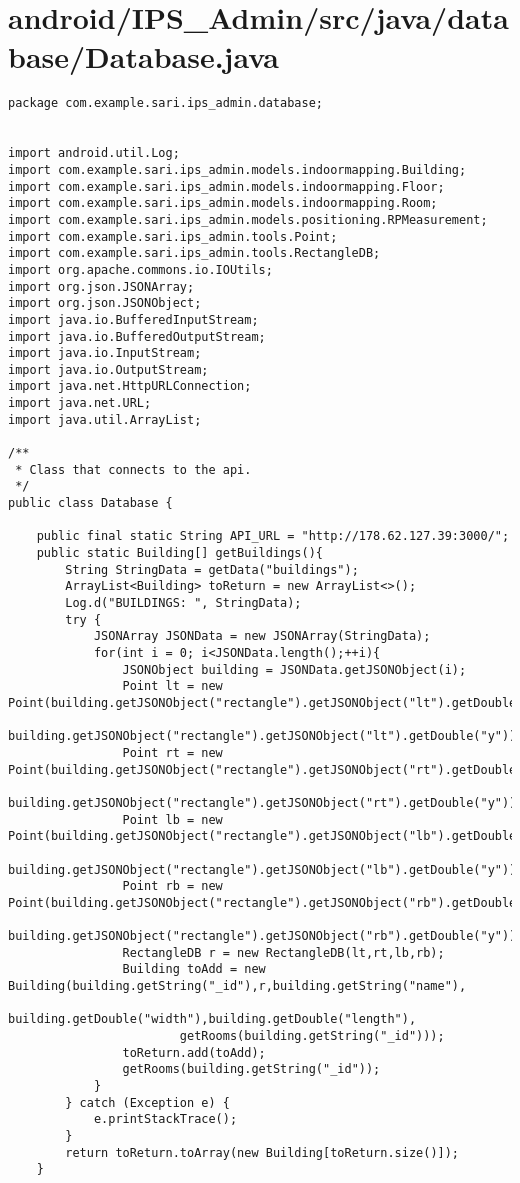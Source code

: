 \section{android/IPS\_Admin/src/java/database/Database.java}
\begin{lstlisting}package com.example.sari.ips_admin.database;


import android.util.Log;
import com.example.sari.ips_admin.models.indoormapping.Building;
import com.example.sari.ips_admin.models.indoormapping.Floor;
import com.example.sari.ips_admin.models.indoormapping.Room;
import com.example.sari.ips_admin.models.positioning.RPMeasurement;
import com.example.sari.ips_admin.tools.Point;
import com.example.sari.ips_admin.tools.RectangleDB;
import org.apache.commons.io.IOUtils;
import org.json.JSONArray;
import org.json.JSONObject;
import java.io.BufferedInputStream;
import java.io.BufferedOutputStream;
import java.io.InputStream;
import java.io.OutputStream;
import java.net.HttpURLConnection;
import java.net.URL;
import java.util.ArrayList;

/**
 * Class that connects to the api.
 */
public class Database {

    public final static String API_URL = "http://178.62.127.39:3000/";
    public static Building[] getBuildings(){
        String StringData = getData("buildings");
        ArrayList<Building> toReturn = new ArrayList<>();
        Log.d("BUILDINGS: ", StringData);
        try {
            JSONArray JSONData = new JSONArray(StringData);
            for(int i = 0; i<JSONData.length();++i){
                JSONObject building = JSONData.getJSONObject(i);
                Point lt = new Point(building.getJSONObject("rectangle").getJSONObject("lt").getDouble("x"),
                                     building.getJSONObject("rectangle").getJSONObject("lt").getDouble("y"));
                Point rt = new Point(building.getJSONObject("rectangle").getJSONObject("rt").getDouble("x"),
                                     building.getJSONObject("rectangle").getJSONObject("rt").getDouble("y"));
                Point lb = new Point(building.getJSONObject("rectangle").getJSONObject("lb").getDouble("x"),
                                     building.getJSONObject("rectangle").getJSONObject("lb").getDouble("y"));
                Point rb = new Point(building.getJSONObject("rectangle").getJSONObject("rb").getDouble("x"),
                                     building.getJSONObject("rectangle").getJSONObject("rb").getDouble("y"));
                RectangleDB r = new RectangleDB(lt,rt,lb,rb);
                Building toAdd = new Building(building.getString("_id"),r,building.getString("name"),
                        building.getDouble("width"),building.getDouble("length"),
                        getRooms(building.getString("_id")));
                toReturn.add(toAdd);
                getRooms(building.getString("_id"));
            }
        } catch (Exception e) {
            e.printStackTrace();
        }
        return toReturn.toArray(new Building[toReturn.size()]);
    }


\end{lstlisting}
